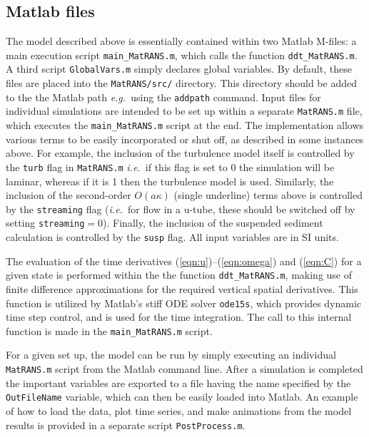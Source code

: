 \documentclass[12pt]{article}
\newcommand{\ie}{{\it i.e.\ }}
\newcommand{\eg}{{\it e.g.\ }}
\begin{document}
\subsection{Matlab files}

The model described above is essentially contained within two Matlab
M-files: a main execution script \texttt{\mbox{main\_MatRANS.m}},
which calls the function \texttt{ddt\_MatRANS.m}.  A third script
\texttt{GlobalVars.m} simply declares global variables.  By default,
these files are placed into the \texttt{MatRANS/src/} directory.  This
directory should be added to the the Matlab path \eg using the
\texttt{addpath} command.  Input files for individual simulations are
intended to be set up within a separate \texttt{MatRANS.m} file, which
executes the \texttt{main\_MatRANS.m} script at the end.  The
implementation allows various terms to be easily incorporated or shut
off, as described in some instances above.  For example, the inclusion
of the turbulence model itself is controlled by the \texttt{turb} flag
in \texttt{MatRANS.m} \ie if this flag is set to 0 the simulation will
be laminar, whereas if it is 1 then the turbulence model is used.
Similarly, the inclusion of the second-order $O(a\kappa)$ (single
underline) terms above is controlled by the \texttt{streaming} flag
(\ie for flow in a u-tube, these should be switched off by setting
\texttt{streaming}$=0$).  Finally, the inclusion of the suspended
sediment calculation is controlled by the \texttt{susp} flag.  All
input variables are in SI units.

The evaluation of the time derivatives
(\ref{eqn:u})--(\ref{eqn:omega}) and (\ref{eqn:C}) for a given state
is performed within the the function \texttt{ddt\_MatRANS.m}, making
use of finite difference approximations for the required vertical
spatial derivatives.  This function is utilized by Matlab's stiff ODE
solver \texttt{ode15s}, which provides dynamic time step control, and
is used for the time integration.  The call to this internal function
is made in the \texttt{main\_MatRANS.m} script.

For a given set up, the model can be run by simply executing an
individual \texttt{MatRANS.m} script from the Matlab command line.
After a simulation is completed the important variables are exported
to a file having the name specified by the \texttt{OutFileName}
variable, which can then be easily loaded into Matlab.  An example of
how to load the data, plot time series, and make animations from the
model results is provided in a separate script \texttt{PostProcess.m}.
\end{document}

